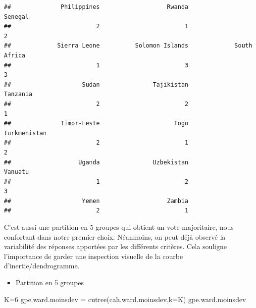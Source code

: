 \documentclass[
]{article}
\newenvironment{Shaded}{}{}
\newcommand{\AttributeTok}[1]{#1}
\newcommand{\DecValTok}[1]{#1}
\newcommand{\FunctionTok}[1]{#1}
\newcommand{\NormalTok}[1]{#1}
\newcommand{\OtherTok}[1]{\textcolor[rgb]{1.00,0.25,0.00}{#1}}
\providecommand{\tightlist}{%
  \setlength{\itemsep}{0pt}\setlength{\parskip}{0pt}}
\begin{document}
\begin{verbatim}
##              Philippines                   Rwanda                  Senegal 
##                        2                        1                        2 
##             Sierra Leone          Solomon Islands             South Africa 
##                        1                        3                        3 
##                    Sudan               Tajikistan                 Tanzania 
##                        2                        2                        1 
##              Timor-Leste                     Togo             Turkmenistan 
##                        2                        1                        2 
##                   Uganda               Uzbekistan                  Vanuatu 
##                        1                        2                        3 
##                    Yemen                   Zambia 
##                        2                        1
\end{verbatim}

C'est aussi une partition en 5 groupes qui obtient un vote majoritaire,
nous confortant dans notre premier choix. Néanmoins, on peut déjà
observé la variabilité des réponses apportées par les différents
critères. Cela souligne l'importance de garder une inspection visuelle
de la courbe d'inertie/dendrogramme.

\begin{itemize}
\tightlist
\item
  Partition en 5 groupes
\end{itemize}

\begin{Shaded}
\begin{Highlighting}[]
\NormalTok{K}\OtherTok{=}\DecValTok{6}
\NormalTok{gpe.ward.moinsdev }\OtherTok{=} \FunctionTok{cutree}\NormalTok{(cah.ward.moinsdev,}\AttributeTok{k=}\NormalTok{K)}
\NormalTok{gpe.ward.moinsdev}
\end{Highlighting}
\end{Shaded}
\end{document}
